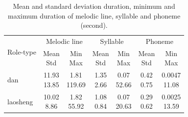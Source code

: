 \begin{table}[ht]
    \centering
    \caption{Mean and standard deviation duration, minimum and maximum duration of melodic line, syllable and phoneme (second).}
    \label{table:ch4:mean_std_min_max}
    \begin{tabular}{l|cc|cc|cc}
        \toprule
        \multirow{2}{*}{Role-type} & \multicolumn{2}{c|}{Melodic line} & \multicolumn{2}{c|}{Syllable} & \multicolumn{2}{c}{Phoneme} \\
        & \makecell{Mean\\Std} & \makecell{Min\\Max} & \makecell{Mean\\Std} & \makecell{Min\\Max} & \makecell{Mean\\Std} & \makecell{Min\\Max} \\
        \midrule
        dan           & \makecell{11.93\\13.85} & \makecell{1.81\\119.69} & \makecell{1.35\\2.66} & \makecell{0.07\\52.66} & \makecell{0.42\\0.75} & \makecell{0.0047\\11.08} \\
        \hline
        laosheng      & \makecell{10.02\\8.86} & \makecell{1.82\\55.92} & \makecell{1.08\\0.84} & \makecell{0.07\\20.63} & \makecell{0.29\\0.62} & \makecell{0.0025\\13.59} \\
        \bottomrule
    \end{tabular}
\end{table}

